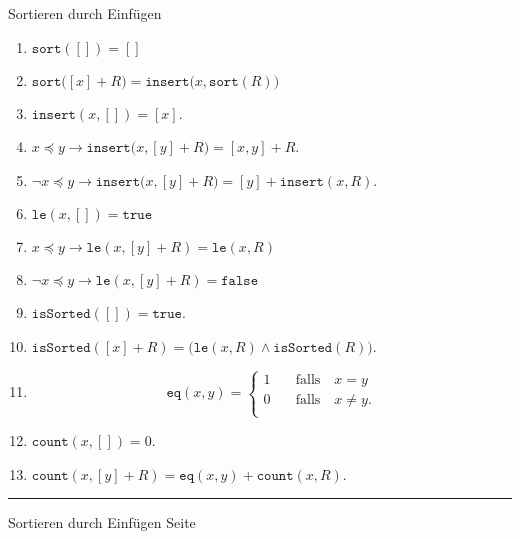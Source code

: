 \documentclass{slides}
\newcounter{mypage}
\begin{document}
\begin{slide}{}
  \begin{center}
Sortieren durch Einf\"ugen
\end{center}

\footnotesize
\begin{enumerate}
\item $\mathtt{sort}([]) = []$
\item $\mathtt{sort}\bigl([x] + R\bigr) = \mathtt{insert}\bigl(x, \mathtt{sort}(R)\bigr)$
\item $\mathtt{insert}(x,[]) = [x]$.
\item $x \preceq y \rightarrow \mathtt{insert}\bigl(x, [y] + R\bigr) = [x,y] + R$. 
\item $\neg x \preceq y \rightarrow \mathtt{insert}\bigl(x, [y] + R\bigr) = [y] + \mathtt{insert}(x,R)$. 
\item $\mathtt{le}(x, []) = \mathtt{true}$
\item $x \preceq y \rightarrow \mathtt{le}(x, [y] + R) = \mathtt{le}(x, R)$
\item $\neg x \preceq y \rightarrow \mathtt{le}(x, [y] + R) = \mathtt{false}$
\item $\mathtt{isSorted}([]) = \mathtt{true}$.

\item $\mathtt{isSorted}([x]+R) = \bigl(\mathtt{le}(x,R) \wedge \mathtt{isSorted}(R)\bigr)$.

\item 
  $$
  \mathtt{eq}(x,y) = \left\{
  \begin{array}{ll}
    1 & \quad \mbox{falls}\quad x = y \\
    0 & \quad \mbox{falls}\quad x \not= y. \\
  \end{array}
  \right.
  $$

\item $\mathtt{count}(x,[]) = 0$.

\item $\mathtt{count}(x,[y] + R) = \mathtt{eq}(x,y) + \mathtt{count}(x, R)$.
\end{enumerate}


\footnotesize

\vspace*{\fill}
\tiny \addtocounter{mypage}{1}
\rule{17cm}{1mm}
Sortieren durch Einf\"ugen  \hspace*{\fill} Seite 
\end{slide}

\end{document}
